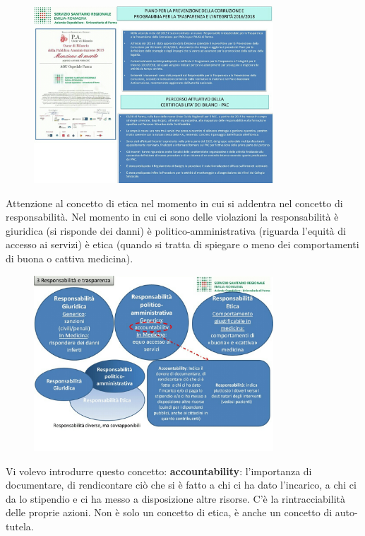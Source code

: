  \begin{figure}[!ht]
\centering
	\includegraphics[width=0.8\textwidth]{32/image15.jpeg}
	\end{figure}

Attenzione al concetto di etica nel momento in cui si addentra nel
concetto di responsabilità. Nel momento in cui ci sono delle violazioni
la responsabilità è giuridica (si risponde dei danni) è
politico-amministrativa (riguarda l'equità di accesso ai servizi) è
etica (quando si tratta di spiegare o meno dei comportamenti di buona o
cattiva medicina).

 \begin{figure}[!ht]
\centering
	\includegraphics[width=0.8\textwidth]{32/image16.jpeg}
	\end{figure}

Vi volevo introdurre questo concetto: \textbf{accountability}:
l'importanza di documentare, di rendicontare ciò che si è fatto a chi ci
ha dato l'incarico, a chi ci da lo stipendio e ci ha messo a
disposizione altre risorse. C'è la rintracciabilità delle proprie
azioni. Non è solo un concetto di etica, è anche un concetto di
auto-tutela.

